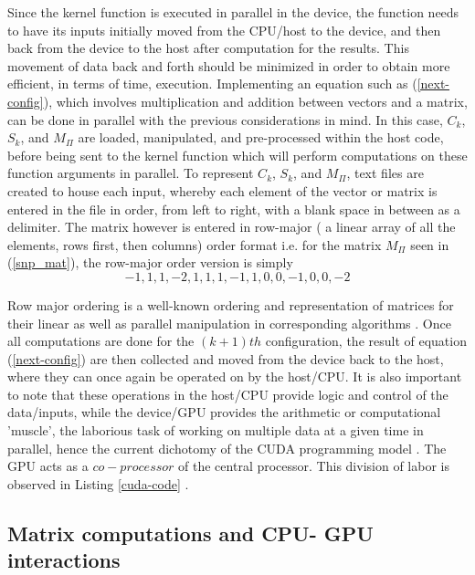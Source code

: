 \documentclass{svmultm}
\newcommand{\sredmark}[2]{\color{red} \sout{#1} #2 \color{black}}
\begin{document}
Since the kernel function is executed in parallel in
the device, the function needs to have its {inputs}
initially moved from the CPU/host to the device, and then back from the device to the
host after computation { for the results}. This movement of data back and forth should be minimized in order to obtain more efficient,
in terms of time, execution.
Implementing an equation such as (\ref{next-config}), which involves
multiplication and addition between vectors and a matrix,
can be done in parallel with the previous considerations in
mind. In this case, $C_k$, $S_k$, and $M_{\Pi}$ are loaded, manipulated, and pre-processed within the host code,
before being sent to the kernel function which will perform
computations on these function arguments in parallel.
To represent $C_k$, $S_k$, and $M_{\Pi}$, text files are created 
to house each input, whereby each element of the
vector or matrix is entered in the file in order, from left to right, with a blank space in between as a delimiter. The
matrix however is entered in row-major ( a linear array of all
the elements, rows first, then columns) order format i.e. for
the matrix $M_{\Pi}$ seen in (\ref{snp_mat}), the row-major order version is simply
\begin{equation}\label{row-maj}
-1, 1, 1, -2, 1, 1, 1, -1, 1, 0, 0, -1, 0, 0, -2
\end{equation}

Row major ordering is a well-known ordering and
representation of matrices for their linear as well as parallel
manipulation in corresponding algorithms \cite{cudabook}. Once all
computations are done for the $(k+1)th$ configuration, the result of
equation (\ref{next-config}) are then collected and moved from the
device back to the host, where they can once again be
operated on by the host/CPU. It is also important to note
that these operations in the host/CPU provide logic and
control of the data/inputs, while the device/GPU provides
the arithmetic or computational 'muscle', the laborious task
of working on multiple data at a given time in parallel,
hence the current dichotomy of the CUDA programming model \cite{sat}. The GPU acts as a $co-processor$ of the central processor.
This division of labor is observed in Listing \ref{cuda-code} .

\subsection{Matrix computations and CPU- {GPU} interactions}
\end{document}
